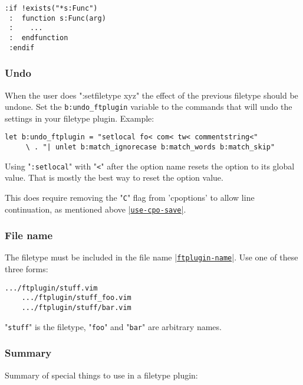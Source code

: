\begin{Verbatim}[samepage=true]
 :if !exists("*s:Func")
 :  function s:Func(arg)
 :    ...
 :  endfunction
 :endif
\end{Verbatim}

\subsubsection{Undo}
\label{undo_ftplugin}

When the user does ":setfiletype xyz" the effect of the previous filetype should be undone.
Set the \verb!b:undo_ftplugin! variable to the commands that will undo the settings in your filetype plugin.
Example:

\begin{Verbatim}[samepage=true]
 let b:undo_ftplugin = "setlocal fo< com< tw< commentstring<"
     \ . "| unlet b:match_ignorecase b:match_words b:match_skip"
\end{Verbatim}

Using "\verb!:setlocal!" with "\verb!<!" after the option name resets the option to its global value.
That is mostly the best way to reset the option value.

This does require removing the "\verb!C!" flag from 'cpoptions' to allow line continuation, as mentioned above \hyperref[use-cpo-save]{|\texttt{use-cpo-save}|}.

\subsubsection{File name}
The filetype must be included in the file name \hyperref[ftplugin-name]{|\texttt{ftplugin-name}|}.
Use one of these three forms:

\begin{Verbatim}[samepage=true]
    .../ftplugin/stuff.vim
    .../ftplugin/stuff_foo.vim
    .../ftplugin/stuff/bar.vim
\end{Verbatim}

"\verb!stuff!" is the filetype, "\verb!foo!" and "\verb!bar!" are arbitrary names.

\subsubsection{Summary}
\label{ftplugin-special}
Summary of special things to use in a filetype plugin:

